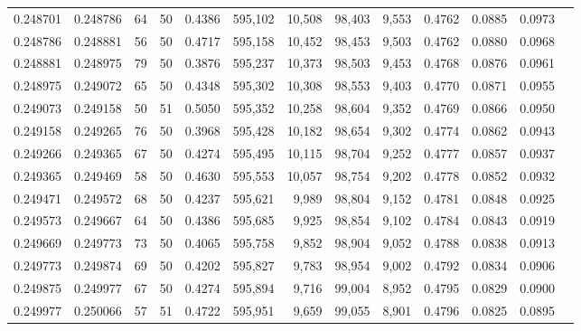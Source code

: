\begin{tabular}{rrrrrrrrrrrrr}
0.248701 & 0.248786 &    64 &  50 &                                     0.4386 & 595,102 &  10,508 &  98,403 &   9,553 & 0.4762 & 0.0885 & 0.0973 \\
0.248786 & 0.248881 &    56 &  50 &                                     0.4717 & 595,158 &  10,452 &  98,453 &   9,503 & 0.4762 & 0.0880 & 0.0968 \\
0.248881 & 0.248975 &    79 &  50 &                                     0.3876 & 595,237 &  10,373 &  98,503 &   9,453 & 0.4768 & 0.0876 & 0.0961 \\
0.248975 & 0.249072 &    65 &  50 &                                     0.4348 & 595,302 &  10,308 &  98,553 &   9,403 & 0.4770 & 0.0871 & 0.0955 \\
0.249073 & 0.249158 &    50 &  51 &                                     0.5050 & 595,352 &  10,258 &  98,604 &   9,352 & 0.4769 & 0.0866 & 0.0950 \\
0.249158 & 0.249265 &    76 &  50 &                                     0.3968 & 595,428 &  10,182 &  98,654 &   9,302 & 0.4774 & 0.0862 & 0.0943 \\
0.249266 & 0.249365 &    67 &  50 &                                     0.4274 & 595,495 &  10,115 &  98,704 &   9,252 & 0.4777 & 0.0857 & 0.0937 \\
0.249365 & 0.249469 &    58 &  50 &                                     0.4630 & 595,553 &  10,057 &  98,754 &   9,202 & 0.4778 & 0.0852 & 0.0932 \\
0.249471 & 0.249572 &    68 &  50 &                                     0.4237 & 595,621 &   9,989 &  98,804 &   9,152 & 0.4781 & 0.0848 & 0.0925 \\
0.249573 & 0.249667 &    64 &  50 &                                     0.4386 & 595,685 &   9,925 &  98,854 &   9,102 & 0.4784 & 0.0843 & 0.0919 \\
0.249669 & 0.249773 &    73 &  50 &                                     0.4065 & 595,758 &   9,852 &  98,904 &   9,052 & 0.4788 & 0.0838 & 0.0913 \\
0.249773 & 0.249874 &    69 &  50 &                                     0.4202 & 595,827 &   9,783 &  98,954 &   9,002 & 0.4792 & 0.0834 & 0.0906 \\
0.249875 & 0.249977 &    67 &  50 &                                     0.4274 & 595,894 &   9,716 &  99,004 &   8,952 & 0.4795 & 0.0829 & 0.0900 \\
0.249977 & 0.250066 &    57 &  51 &                                     0.4722 & 595,951 &   9,659 &  99,055 &   8,901 & 0.4796 & 0.0825 & 0.0895 \\

\end{tabular}
